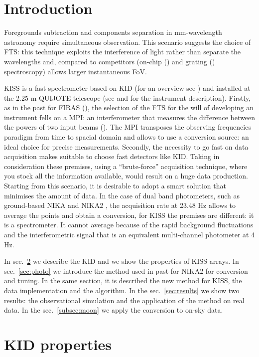 \documentclass[twocolumn,traditabstract]{aa}\\
\begin{document}
\section{Introduction}

Foregrounds subtraction and components separation in mm-wavelength astronomy require simultaneous observation. This scenario suggests the choice of FTS: this technique exploits the interference of light rather than separate the wavelengths and, compared to competitors (on-chip (\cite{deshima}) and grating (\cite{grating}) spectroscopy) allows larger instantaneous FoV.

KISS is a fast spectrometer based on KID (for an overview see \cite{kids}) and installed at the 2.25 m QUIJOTE telescope (see \cite{fasano-ltd} and \cite{fasano-nika2} for the instrument description). Firstly, as in the past for FIRAS (\cite{FIRAS}), the selection of the FTS for the will of developing an instrument fells on a MPI: an interferometer that measures the difference between the powers of two input beams (\cite{mpi}). The MPI transposes the observing frequencies paradigm from time to spacial domain and allows to use a conversion source: an ideal choice for precise measurements.
Secondly, the necessity to go fast on data acquisition makes suitable to choose fast detectors like KID. Taking in consideration these premises, using a ``brute-force'' acquisition technique, where you stock all the information available, would result on a huge data production. Starting from this scenario, it is desirable to adopt a smart solution that minimises the amount of data.
In the case of dual band photometers, such as ground-based NIKA \cite{Monfardini_2010:NIKA} and NIKA2 \cite{nika2}, the acquisition rate at 23.48 Hz allows to average the points and obtain a conversion, for KISS the premises are different: it is a spectrometer. It cannot average because of the rapid background fluctuations and the interferometric signal that is an equivalent multi-channel photometer at 4 Hz.

In sec.~\ref{sec:kid} we describe the KID and we show the properties of KISS arrays. 
In sec.~\ref{sec:photo} we introduce the method used in past for NIKA2 for conversion and tuning. In the same section, it is described the new method for KISS, the data implementation and the algorithm.
In the sec.~\ref{sec:results}  we show two results: the observational simulation and the application of the method on real data. In the sec.~\ref{subsec:moon} we apply the conversion to on-sky data.

\section{KID properties}
\label{sec:kid}
\end{document}
